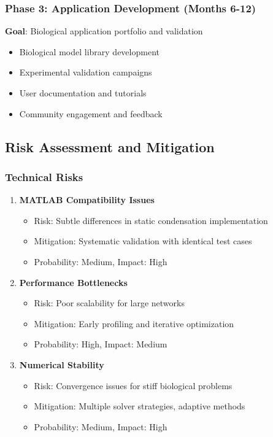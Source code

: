 \subsubsection{Phase 3: Application Development (Months 6-12)}
\textbf{Goal}: Biological application portfolio and validation

\begin{itemize}
    \item Biological model library development
    \item Experimental validation campaigns
    \item User documentation and tutorials
    \item Community engagement and feedback
\end{itemize}

\subsection{Risk Assessment and Mitigation}

\subsubsection{Technical Risks}
\begin{enumerate}
    \item \textbf{MATLAB Compatibility Issues}
    \begin{itemize}
        \item Risk: Subtle differences in static condensation implementation
        \item Mitigation: Systematic validation with identical test cases
        \item Probability: Medium, Impact: High
    \end{itemize}
    
    \item \textbf{Performance Bottlenecks}
    \begin{itemize}
        \item Risk: Poor scalability for large networks
        \item Mitigation: Early profiling and iterative optimization
        \item Probability: High, Impact: Medium
    \end{itemize}
    
    \item \textbf{Numerical Stability}
    \begin{itemize}
        \item Risk: Convergence issues for stiff biological problems
        \item Mitigation: Multiple solver strategies, adaptive methods
        \item Probability: Medium, Impact: High
    \end{itemize}
\end{enumerate}

